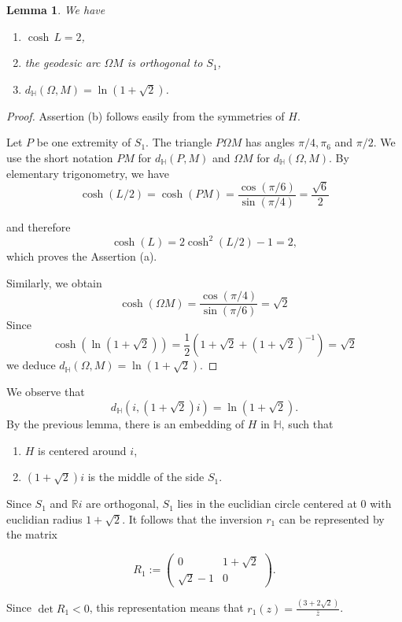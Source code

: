 \documentclass[12pt]{amsart}
\newcommand{\HP}{\mathbb{H}}
\newcommand{\R}{\mathbb{R}}
\newtheorem{lemma}{Lemma}
\begin{document}
\begin{lemma} We have

\begin{enumerate}
\item[(a)] $\cosh\,L=2$,
\item[(b)] the geodesic arc $\Omega M$  is orthogonal to $S_1$,
\item[(c)] $d_\HP(\Omega, M)=\ln(1+\sqrt{2})$.
\end{enumerate}
\end{lemma}

\begin{proof} Assertion (b) follows easily from the symmetries of $H$. 

Let $P$ be one extremity of $S_1$. The triangle 
$P\Omega M$ has angles $\pi/4, \pi_6$ and $\pi/2$.
We use the short notation $PM$ for $d_\HP(P,M)$ and 
$\Omega M$ for $d_\HP(\Omega,M)$. By elementary trigonometry, we have
$$ \cosh(L/2)=\cosh(PM)=
\frac{\cos(\pi/6)}{\sin(\pi/4)}=\frac{\sqrt{6}}{2}$$

\noindent and therefore
$$\cosh(L)=2\cosh^2(L/2)-1=2,$$
which proves the Assertion (a).

Similarly, we obtain
$$
\cosh(\Omega M)=\frac{\cos(\pi/4)}{\sin(\pi/6)}=\sqrt{2}$$
Since 
$$\cosh(\ln(1+\sqrt{2}))= 
\frac{1}{2} (1+\sqrt{2}+(1+\sqrt{2})^{-1})=\sqrt{2}$$
we deduce $d_\HP(\Omega, M)=\ln(1+\sqrt{2}).$
\end{proof}

We observe that 
$$d_\HP(i,(1+ \sqrt{2})i)=\ln(1+\sqrt{2}).$$
By the previous lemma,  there is an embedding of $H$ in $\HP$, such that
\begin{enumerate}
\item[(a)] $H$ is centered around $i$, 
\item[(b)] $(1+\sqrt{2})i$ is the middle of the side $S_1$.
\end{enumerate}

Since $S_1$ and $\R i$ are orthogonal, $S_1$ lies
in the euclidian circle centered at $0$ with euclidian
radius $1+\sqrt{2}$.
It follows that the inversion $r_1$ can be represented by the matrix


$$R_1:=\begin{pmatrix}
0&1+\sqrt{2} \\
 \sqrt{2}-1&0
\end{pmatrix}.$$

\noindent Since $\det R_1<0$, this  representation means that $r_1(z)=\frac{(3+2\sqrt{2})}{\overline z}$.
\end{document}
